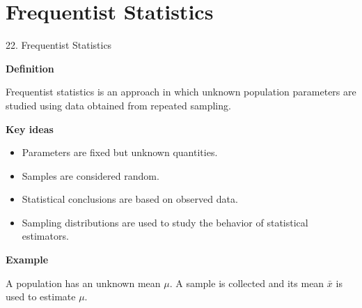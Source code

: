 
\section{Frequentist Statistics}


\begin{frame}{22. Frequentist Statistics}

\textbf{Definition}

Frequentist statistics is an approach in which unknown population
parameters are studied using data obtained from repeated
sampling.

\vspace{0.4cm}

\textbf{Key ideas}

\begin{itemize}
    \item Parameters are fixed but unknown quantities.
    \item Samples are considered random.
    \item Statistical conclusions are based on observed data.
    \item Sampling distributions are used to study the behavior
    of statistical estimators.
\end{itemize}

\vspace{0.3cm}

\textbf{Example}

A population has an unknown mean $\mu$.
A sample is collected and its mean $\bar{x}$ is used to estimate $\mu$.

\end{frame}



